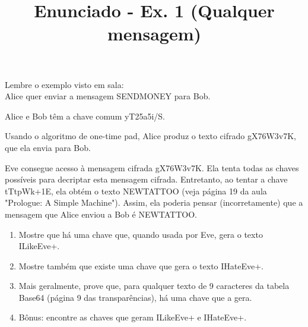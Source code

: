 \documentclass{article}
\title{Enunciado - Ex. 1 (Qualquer mensagem)}
\date{}
\author{}
\begin{document}
\maketitle

Lembre o exemplo visto em sala:\\

Alice quer enviar a mensagem SENDMONEY para Bob.

Alice e Bob t\^em a chave comum yT25a5i/S.

Usando o algoritmo de one-time pad, Alice produz o texto cifrado gX76W3v7K, que ela envia para Bob.

Eve consegue acesso \`a mensagem cifrada gX76W3v7K. Ela tenta todas as chaves poss\'iveis para decriptar esta mensagem cifrada. Entretanto, ao tentar a chave tTtpWk+1E, ela obt\'em o texto NEWTATTOO (veja p\'agina 19 da aula "Prologue: A Simple Machine"). Assim, ela poderia pensar (incorretamente) que a mensagem que Alice enviou a Bob \'e NEWTATTOO.

	\begin{enumerate}
		\item Mostre que h\'a uma chave que, quando usada por Eve, gera o texto ILikeEve+.
		\item Mostre tamb\'em que existe uma chave que gera o texto IHateEve+.
		\item Mais geralmente, prove que, para qualquer texto de 9 caracteres da tabela Base64 (página 9 das transparências), h\'a uma chave que a gera.
		\item B\^onus: encontre as chaves que geram ILikeEve+ e IHateEve+.
	\end{enumerate}
\end{document}
